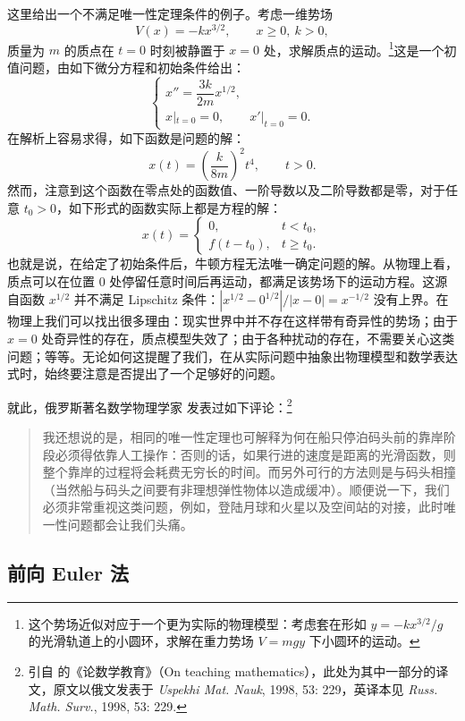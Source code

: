 这里给出一个不满足唯一性定理条件的例子。考虑一维势场
\[
V(x)=-kx^{3/2},\qquad x\ge 0,\ k>0,
\]
质量为 $m$ 的质点在 $t=0$ 时刻被静置于 $x=0$ 处，求解质点的运动。\footnote{这个势场近似对应于一个更为实际的物理模型：考虑套在形如 $y=-kx^{3/2}/g$ 的光滑轨道上的小圆环，求解在重力势场 $V=mgy$ 下小圆环的运动。}这是一个初值问题，由如下微分方程和初始条件给出：
\[
\begin{cases}
x''=\dfrac{3k}{2m}x^{1/2},\\
x|_{t=0}=0,\qquad x'|_{t=0}=0.
\end{cases}
\]
在解析上容易求得，如下函数是问题的解：
\[
x(t)=\left(\frac{k}{8m}\right)^2t^4,\qquad t>0.
\]
然而，注意到这个函数在零点处的函数值、一阶导数以及二阶导数都是零，对于任意 $t_0>0$，如下形式的函数实际上都是方程的解：
\[
x(t)=
\begin{cases}
0,&t<t_0,\\
f(t-t_0),&t\ge t_0.
\end{cases}
\]
也就是说，在给定了初始条件后，牛顿方程无法唯一确定问题的解。从物理上看，质点可以在位置 0 处停留任意时间后再运动，都满足该势场下的运动方程。这源自函数 $x^{1/2}$ 并不满足 Lipschitz 条件：$|x^{1/2}-0^{1/2}|/|x-0|=x^{-1/2}$ 没有上界。在物理上我们可以找出很多理由：现实世界中并不存在这样带有奇异性的势场；由于 $x=0$ 处奇异性的存在，质点模型失效了；由于各种扰动的存在，不需要关心这类问题；等等。无论如何这提醒了我们，在从实际问题中抽象出物理模型和数学表达式时，始终要注意是否提出了一个足够好的问题。

就此，俄罗斯著名数学物理学家  发表过如下评论：\footnote{引自  的《论数学教育》（On teaching mathematics），此处为其中一部分的译文，原文以俄文发表于 \textit{Uspekhi Mat. Nauk}, 1998, 53: 229，英译本见 \textit{Russ. Math. Surv.}, 1998, 53: 229.}
\begin{quote}\small
我还想说的是，相同的唯一性定理也可解释为何在船只停泊码头前的靠岸阶段必须得依靠人工操作：否则的话，如果行进的速度是距离的光滑函数，则整个靠岸的过程将会耗费无穷长的时间。而另外可行的方法则是与码头相撞（当然船与码头之间要有非理想弹性物体以造成缓冲）。顺便说一下，我们必须非常重视这类问题，例如，登陆月球和火星以及空间站的对接，此时唯一性问题都会让我们头痛。
\end{quote}

\subsection{前向 Euler 法}

